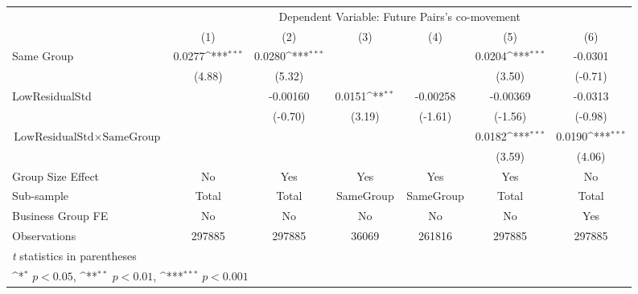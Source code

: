 {
\def\sym#1{\ifmmode^{#1}\else\(^{#1}\)\fi}
\begin{tabular}{l*{6}{c}}
\hline\hline
                &\multicolumn{6}{c}{Dependent Variable:  Future Pairs's co-movement}                                              \\\cmidrule(lr){2-7}
                &\multicolumn{1}{c}{(1)}         &\multicolumn{1}{c}{(2)}         &\multicolumn{1}{c}{(3)}         &\multicolumn{1}{c}{(4)}         &\multicolumn{1}{c}{(5)}         &\multicolumn{1}{c}{(6)}         \\
\hline
Same Group      &   0.0277\sym{***}&   0.0280\sym{***}&                  &                  &   0.0204\sym{***}&  -0.0301         \\
                &   (4.88)         &   (5.32)         &                  &                  &   (3.50)         &  (-0.71)         \\
[1em]
LowResidualStd  &                  & -0.00160         &   0.0151\sym{**} & -0.00258         & -0.00369         &  -0.0313         \\
                &                  &  (-0.70)         &   (3.19)         &  (-1.61)         &  (-1.56)         &  (-0.98)         \\
[1em]
$ {\text{LowResidualStd} } \times {\text{SameGroup} }  $ &                  &                  &                  &                  &   0.0182\sym{***}&   0.0190\sym{***}\\
                &                  &                  &                  &                  &   (3.59)         &   (4.06)         \\
\hline
Group Size Effect&       No         &      Yes         &      Yes         &      Yes         &      Yes         &       No         \\
Sub-sample      &    Total         &    Total         &SameGroup         &SameGroup         &    Total         &    Total         \\
Business Group FE&       No         &       No         &       No         &       No         &       No         &      Yes         \\
Observations    &   297885         &   297885         &    36069         &   261816         &   297885         &   297885         \\
\hline\hline
\multicolumn{7}{l}{\footnotesize \textit{t} statistics in parentheses}\\
\multicolumn{7}{l}{\footnotesize \sym{*} \(p<0.05\), \sym{**} \(p<0.01\), \sym{***} \(p<0.001\)}\\
\end{tabular}
}
